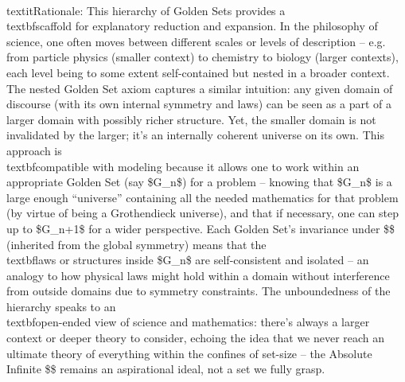 \documentclass[11pt]{article}
\begin{document}
    \\textit{Rationale:} This hierarchy of Golden Sets provides a \\textbf{scaffold for explanatory reduction and expansion}. In the philosophy of science, one often moves between different scales or levels of description – e.g. from particle physics (smaller context) to chemistry to biology (larger contexts), each level being to some extent self-contained but nested in a broader context. The nested Golden Set axiom captures a similar intuition: any given domain of discourse (with its own internal symmetry and laws) can be seen as a part of a larger domain with possibly richer structure. Yet, the smaller domain is not invalidated by the larger; it’s an internally coherent universe on its own. This approach is \\textbf{compatible with modeling} because it allows one to work within an appropriate Golden Set (say \$G\_n\$) for a problem – knowing that \$G\_n\$ is a large enough “universe” containing all the needed mathematics for that problem (by virtue of being a Grothendieck universe), and that if necessary, one can step up to \$G\_{n+1}\$ for a wider perspective. Each Golden Set’s invariance under \$\Sym\$ (inherited from the global symmetry) means that the \\textbf{laws or structures inside \$G\_n\$ are self-consistent and isolated} – an analogy to how physical laws might hold within a domain without interference from outside domains due to symmetry constraints. The unboundedness of the hierarchy speaks to an \\textbf{open-ended view of science and mathematics}: there’s always a larger context or deeper theory to consider, echoing the idea that we never reach an ultimate theory of everything within the confines of set-size – the Absolute Infinite \$\infty\$ remains an aspirational ideal, not a set we fully grasp.
\end{document}
